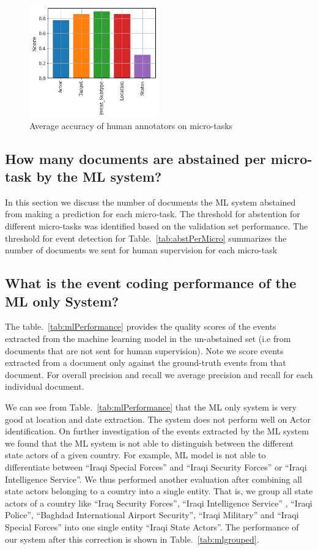 \begin{figure}[h!]
    \centering
    \includegraphics[width=0.5\textwidth]{figures/micro_task_performance.png}
    \caption{Average accuracy of human annotators on micro-tasks}
    \label{fig:microPerf}
\end{figure}

\subsection{How many documents are abstained per micro-task by the ML system?}

In this section we discuss the number of documents the ML system abstained from making a prediction for each micro-task. The threshold for abstention for different micro-tasks was identified based on the validation set performance.  The threshold for event detection for Table.~\ref{tab:abstPerMicro} summarizes the number of documents we sent for human supervision for each micro-task

\subsection{What is the event coding performance of the ML only System?}

The table.~\ref{tab:mlPerformance} provides the quality scores of the events extracted from the machine learning model in the un-abstained set  (i.e from documents that are not sent for human supervision). Note we score events extracted from a document only against the ground-truth events from that document. For overall precision and recall we average precision and recall for each individual document. 

We can see from Table.~\ref{tab:mlPerformance} that the ML only system is very good at location and date extraction. The system does not perform well on  Actor identification. On further investigation of the events extracted by the ML system we found that the ML system is not able to distinguish between the different state actors of a given country. For example, ML model is not able to differentiate between “Iraqi Special Forces” and “Iraqi Security Forces” or “Iraqi Intelligence Service”.  We thus performed another evaluation after combining all state actors belonging to a country into a single entity. That is, we group all state actors of a country like “Iraq Security Forces”, “Iraqi Intelligence Service” , “Iraqi Police”, “Baghdad International Airport Security”, “Iraqi Military” and “Iraqi Special Forces” into one single entity  “Iraqi State Actors”.  The performance of our system after this correction is shown in Table.~\ref{tab:mlgrouped}.




